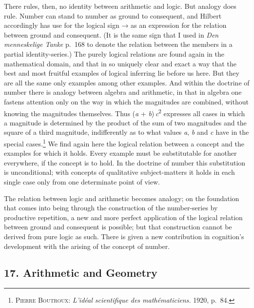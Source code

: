\documentclass[12pt]{book}
\newcommand{\opage}[1]{\marginnote{\footnotesize\textit{[#1]}}}
\begin{document}
There rules, then, no identity between arithmetic and logic. But analogy does
rule. Number can stand to number as ground to consequent, and Hilbert accordingly
has use for the logical sign → as an expression for the relation between ground
and consequent. (It is the same sign that I used in \textit{Den menneskelige
Tanke} p.\ 168 to denote the relation between the members in a partial
identity-series.) The purely logical relations are found again in the mathematical
domain, and that in so uniquely clear and exact a way that the best and most
fruitful examples of logical inferring lie before us here. But they are all the
same only examples among other examples. And within the doctrine of number there
is analogy between algebra and arithmetic, in that in algebra one fastens
\opage{85}attention only on the way in which the magnitudes are combined, without knowing
the magnitudes themselves. Thus (\textit{a} + \textit{b})\,\textit{c}\textsuperscript{2}
expresses all cases in which a magnitude is determined by the product of the sum
of two magnitudes and the square of a third magnitude, indifferently as to what
values \textit{a}, \textit{b} and \textit{c} have in the special
cases.\footnote{\textsc{Pierre Boutroux:} \textit{L'idéal scientifique des
mathématiciens.} 1920, p.\ 84.} We find again here the logical relation between a
concept and the examples for which it holds. Every example must be substitutable
for another everywhere, if the concept is to hold. In the doctrine of number this
substitution is unconditional; with concepts of qualitative subject-matters it
holds in each single case only from one determinate point of view.

The relation between logic and arithmetic becomes analogy; on the foundation that
comes into being through the construction of the number-series by productive
repetition, a new and more perfect application of the logical relation between
ground and consequent is possible; but that construction cannot be derived from
pure logic as such. There is given a new contribution in cognition's development
with the arising of the concept of number.

\subsection*{17. Arithmetic and Geometry}
\end{document}
